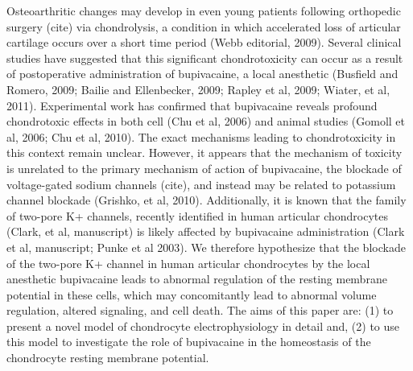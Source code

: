 Osteoarthritic changes may develop in even young patients following orthopedic surgery (cite) via chondrolysis, a condition in which accelerated loss of articular cartilage occurs over a short time period (Webb editorial, 2009).
Several clinical studies have suggested that this significant chondrotoxicity can occur as a result of postoperative administration of bupivacaine, a local anesthetic (Busfield and Romero, 2009; Bailie and Ellenbecker, 2009; Rapley et al, 2009; Wiater, et al, 2011). 
Experimental work has confirmed that bupivacaine reveals profound chondrotoxic effects in both cell (Chu et al, 2006) and animal studies (Gomoll et al, 2006; Chu et al, 2010).
The exact mechanisms leading to chondrotoxicity in this context remain unclear.
However, it appears that the mechanism of toxicity is unrelated to the primary mechanism of action of bupivacaine, the blockade of voltage-gated sodium channels (cite), and instead may be related to potassium channel blockade (Grishko, et al, 2010). 
Additionally, it is known that the family of two-pore K+ channels, recently identified in human articular chondrocytes (Clark, et al, manuscript) is likely affected by bupivacaine administration (Clark et al, manuscript; Punke et al 2003).
We therefore hypothesize that the blockade of the two-pore K+ channel in human articular chondrocytes by the local anesthetic bupivacaine leads to abnormal regulation of the resting membrane potential in these cells, which may concomitantly lead to abnormal volume regulation, altered signaling, and cell death.
The aims of this paper are: (1) to present a novel model of chondrocyte electrophysiology in detail and, (2) to use this model to investigate the role of bupivacaine in the homeostasis of the chondrocyte resting membrane potential.



